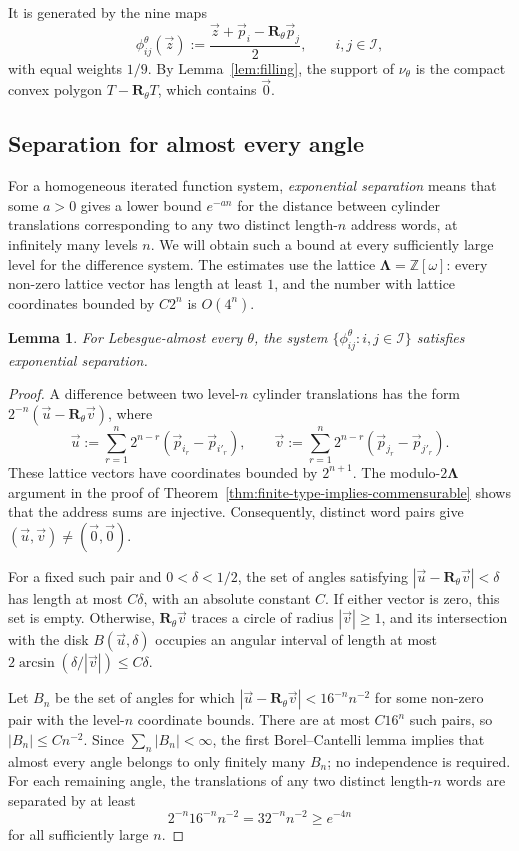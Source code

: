 \documentclass[scheme=plain]{ctexart}
\newtheorem{lemma}[theorem]{Lemma}
\begin{document}
It is generated by the nine maps
\[
\phi_{ij}^{\theta}(\vec z):=\frac{\vec z+\vec p_i-\mathbf R_\theta\vec p_j}{2},
\qquad i,j\in\mathcal I,
\]
with equal weights $1/9$.
By Lemma~\ref{lem:filling}, the support of $\nu_\theta$ is the compact convex polygon $T-\mathbf R_\theta T$, which contains $\vec{0}$.



\subsection{Separation for almost every angle}

For a homogeneous iterated function system, \emph{exponential separation} means that some $a>0$ gives a lower bound $e^{-an}$ for the distance between cylinder translations corresponding to any two distinct length-$n$ address words, at infinitely many levels $n$.
We will obtain such a bound at every sufficiently large level for the difference system.
The estimates use the lattice $\boldsymbol\Lambda=\mathbb Z[\omega]$: every non-zero lattice vector has length at least $1$, and the number with lattice coordinates bounded by $C2^n$ is $O(4^n)$.

\begin{lemma}
\label{lem:ae-exp-sep}
For Lebesgue-almost every $\theta$, the system $\{\phi_{ij}^{\theta}:i,j\in\mathcal I\}$ satisfies exponential separation.
\end{lemma}

\begin{proof}
A difference between two level-$n$ cylinder translations has the form $2^{-n}(\vec u-\mathbf R_\theta\vec v)$, where
\[
\vec u:=\sum_{r=1}^n2^{n-r}(\vec p_{i_r}-\vec p_{i'_r}),
\qquad
\vec v:=\sum_{r=1}^n2^{n-r}(\vec p_{j_r}-\vec p_{j'_r}).
\]
These lattice vectors have coordinates bounded by $2^{n+1}$.
The modulo-$2\boldsymbol\Lambda$ argument in the proof of Theorem~\ref{thm:finite-type-implies-commensurable} shows that the address sums are injective.
Consequently, distinct word pairs give $(\vec u,\vec v)\neq(\vec{0},\vec{0})$.

For a fixed such pair and $0<\delta<1/2$, the set of angles satisfying $|\vec u-\mathbf R_\theta\vec v|<\delta$ has length at most $C\delta$, with an absolute constant $C$.
If either vector is zero, this set is empty.
Otherwise, $\mathbf R_\theta\vec v$ traces a circle of radius $|\vec v|\ge1$, and its intersection with the disk $B(\vec u,\delta)$ occupies an angular interval of length at most $2\arcsin(\delta/|\vec v|)\le C\delta$.

Let $B_n$ be the set of angles for which $|\vec u-\mathbf R_\theta\vec v|<16^{-n}n^{-2}$ for some non-zero pair with the level-$n$ coordinate bounds.
There are at most $C16^n$ such pairs, so $|B_n|\le Cn^{-2}$.
Since $\sum_n|B_n|<\infty$, the first Borel--Cantelli lemma implies that almost every angle belongs to only finitely many $B_n$; no independence is required.
For each remaining angle, the translations of any two distinct length-$n$ words are separated by at least
\[
2^{-n}16^{-n}n^{-2}=32^{-n}n^{-2}\ge e^{-4n}
\]
for all sufficiently large $n$.
\end{proof}
\end{document}
